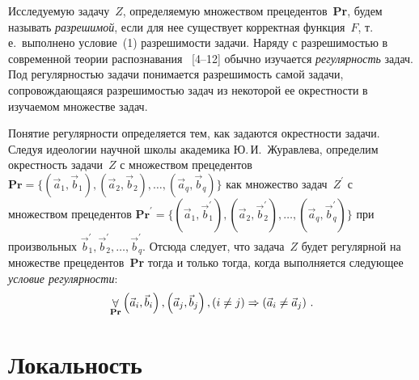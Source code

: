 \begin{multicols}{2}
    Исследуемую задачу~$Z$, определяемую множеством 
прецедентов~\textbf{Pr}, будем  называть \textit{разрешимой}, если для нее 
существует корректная функция~$F$, т.\,е.\ выполнено условие~(1) 
разрешимости задачи. Наряду с разрешимостью в современной теории 
распознавания~ [4--12] обычно изучается \textit{регулярность} 
задач. Под регулярностью задачи понимается разрешимость самой задачи, 
со\-про\-вож\-да\-ющаяся разрешимостью задач из некоторой ее окрестности в 
изучаемом множестве \mbox{задач}. 

    Понятие регулярности определяется тем, как задаются окрестности 
задачи. Следуя идеологии научной школы академика Ю.\,И.~Журавлева, 
определим окрестность задачи~$Z$ с множеством прецедентов $\mathbf{Pr} =\{ 
\left (\vec{a}_1,\vec{b}_1\right), \left(\vec{a}_2,\vec{b}_2\right), \ldots , 
\left(\vec{a}_q,\vec{b}_q\right) \}$ как множество задач~$Z^\prime$ с множеством 
прецедентов $\mathbf{Pr}^\prime =\{ \left (\vec{a}_1,\vec{b}_1^\prime\right), 
\left(\vec{a}_2,\vec{b}_2^\prime\right), \ldots , \left(\vec{a}_q,\vec{b}_q^\prime\right) \}$ 
при произвольных  $\vec{b}_1^\prime, \vec{b}_2^\prime, \ldots , 
\vec{b}_q^\prime$. Отсюда следует, что задача~$Z$ будет регулярной на 
множестве прецедентов~\textbf{Pr} тогда и только тогда, когда выполняется 
следующее \textit{условие регулярности}: 
\begin{equation}
\mathop{\forall}\limits_{\mathbf{Pr}}\left (\vec{a}_i, \vec{b}_i\right),  \left (\vec{a}_j, 
\vec{b}_j\right), \left(i\not=j\right)\Rightarrow \left(\vec{a}_i\not= \vec{a}_j\right)\,.
\label{e2tor}
\end{equation}

\section{Локальность}


\end{multicols}

